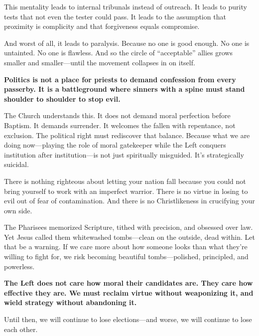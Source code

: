 This mentality leads to internal tribunals instead of outreach. It leads to purity tests that not even the tester could pass. It leads to the assumption that proximity is complicity and that forgiveness equals compromise.

And worst of all, it leads to paralysis. Because no one is good enough. No one is untainted. No one is flawless. And so the circle of ``acceptable'' allies grows smaller and smaller—until the movement collapses in on itself.

\textbf{Politics is not a place for priests to demand confession from every passerby. It is a battleground where sinners with a spine must stand shoulder to shoulder to stop evil.}

The Church understands this. It does not demand moral perfection before Baptism. It demands surrender. It welcomes the fallen with repentance, not exclusion. The political right must rediscover that balance. Because what we are doing now—playing the role of moral gatekeeper while the Left conquers institution after institution—is not just spiritually misguided. It’s strategically suicidal.

There is nothing righteous about letting your nation fall because you could not bring yourself to work with an imperfect warrior. There is no virtue in losing to evil out of fear of contamination. And there is no Christlikeness in crucifying your own side.

The Pharisees memorized Scripture, tithed with precision, and obsessed over law. Yet Jesus called them whitewashed tombs—clean on the outside, dead within. Let that be a warning. If we care more about how someone looks than what they’re willing to fight for, we risk becoming beautiful tombs—polished, principled, and powerless.

\textbf{The Left does not care how moral their candidates are. They care how effective they are. We must reclaim virtue without weaponizing it, and wield strategy without abandoning it.}

Until then, we will continue to lose elections—and worse, we will continue to lose each other.